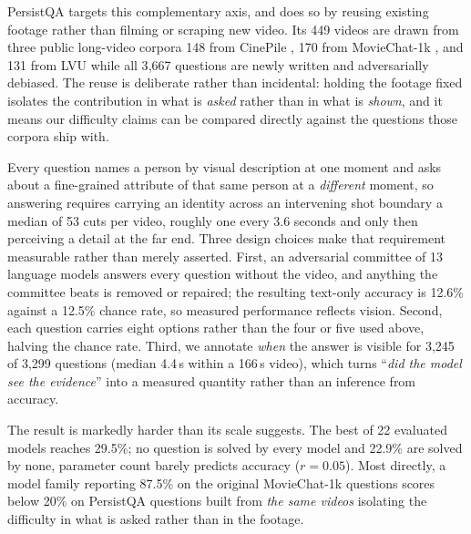 \documentclass{article}
\begin{document}
PersistQA targets this complementary axis, and does so by reusing existing footage
rather than filming or scraping new video. Its 449 videos are drawn from three public
long-video corpora 148 from CinePile \citep{rawal2024cinepile}, 170 from MovieChat-1k
\citep{song2024moviechat}, and 131 from LVU \citep{wu2021lvu} while all 3{,}667
questions are newly written and adversarially debiased. The reuse is deliberate rather
than incidental: holding the footage fixed isolates the contribution in what is
\emph{asked} rather than in what is \emph{shown}, and it means our difficulty claims can
be compared directly against the questions those corpora ship with.

Every question names a person by visual
description at one moment and asks about a fine-grained attribute of that same person at
a \emph{different} moment, so answering requires carrying an identity across an
intervening shot boundary a median of 53 cuts per video, roughly one every 3.6
seconds and only then perceiving a detail at the far end. Three design choices make
that requirement measurable rather than merely asserted. First, an adversarial committee
of 13 language models answers every question without the video, and anything the
committee beats is removed or repaired; the resulting text-only accuracy is 12.6\%
against a 12.5\% chance rate, so measured performance reflects vision. Second, each
question carries eight options rather than the four or five used above, halving the
chance rate. Third, we annotate \emph{when} the answer is visible for 3{,}245 of 3{,}299
questions (median 4.4\,s within a 166\,s video), which turns ``\emph{did the model see the
evidence}'' into a measured quantity rather than an inference from accuracy.

The result is markedly harder than its scale suggests. The best of 22 evaluated models
reaches 29.5\%; no question is solved by every model and 22.9\% are solved by none,
parameter count barely predicts accuracy ($r=0.05$). Most directly, a model family
reporting 87.5\% on the original MovieChat-1k questions scores below 20\% on PersistQA
questions built from \emph{the same videos} isolating the difficulty in what is asked
rather than in the footage.
\end{document}
